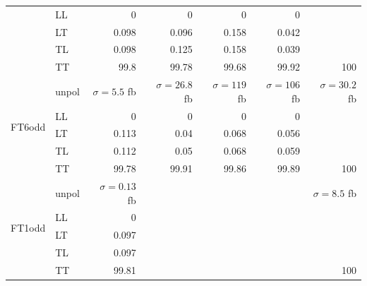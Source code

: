 \begin{table}[h]
{\begin{tabular}{llrrrrr}
 & LL & \num{0} & \num{0} & \num{0} & \num{0} &  \\
 & LT & \num{0.098} & \num{0.096} & \num{0.158} & \num{0.042} &  \\
 & TL & \num{0.098} & \num{0.125} & \num{0.158} & \num{0.039} &  \\
 & TT & \num{99.8} & \num{99.78} & \num{99.68} & \num{99.92} & \num{100} \\
\midrule
\multirow{5}{*}{FT6odd}
 & unpol & $\sigma = \num{5.5}$ fb & $\sigma = \num{26.8}$ fb & $\sigma = \num{119}$ fb & $\sigma = \num{106}$ fb & $\sigma = \num{30.2}$ fb \\
 & LL & \num{0} & \num{0} & \num{0} & \num{0} &  \\
 & LT & \num{0.113} & \num{0.04} & \num{0.068} & \num{0.056} &  \\
 & TL & \num{0.112} & \num{0.05} & \num{0.068} & \num{0.059} &  \\
 & TT & \num{99.78} & \num{99.91} & \num{99.86} & \num{99.89} & \num{100} \\
\midrule
\multirow{5}{*}{FT1odd}
 & unpol & $\sigma = \num{0.13}$ fb &  &  &  & $\sigma = \num{8.5}$ fb \\
 & LL & \num{0} &  &  &  &  \\
 & LT & \num{0.097} &  &  &  &  \\
 & TL & \num{0.097} &  &  &  &  \\
 & TT & \num{99.81} &  &  &  & \num{100} \\
\bottomrule
\end{tabular}
}%
\end{table}